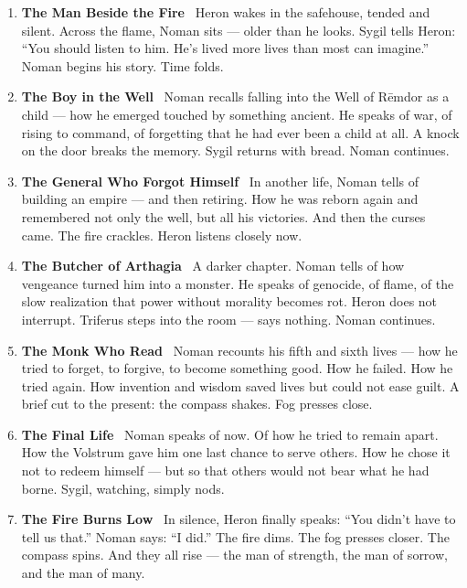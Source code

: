 \documentclass[9pt]{article}
\begin{document}
\begin{center}
\begin{enumerate}
\item \textbf{The Man Beside the Fire} \
Heron wakes in the safehouse, tended and silent. Across the flame, Noman sits — older than he looks. Sygil tells Heron: “You should listen to him. He’s lived more lives than most can imagine.” Noman begins his story. Time folds.

\vspace{.3in}
\item \textbf{The Boy in the Well} \
Noman recalls falling into the Well of Rēmdor as a child — how he emerged touched by something ancient. He speaks of war, of rising to command, of forgetting that he had ever been a child at all. A knock on the door breaks the memory. Sygil returns with bread. Noman continues.

\vspace{.3in}
\item \textbf{The General Who Forgot Himself} \
In another life, Noman tells of building an empire — and then retiring. How he was reborn again and remembered not only the well, but all his victories. And then the curses came. The fire crackles. Heron listens closely now.

\vspace{.3in}
\item \textbf{The Butcher of Arthagia} \
A darker chapter. Noman tells of how vengeance turned him into a monster. He speaks of genocide, of flame, of the slow realization that power without morality becomes rot. Heron does not interrupt. Triferus steps into the room — says nothing. Noman continues.

\vspace{.3in}
\item \textbf{The Monk Who Read} \
Noman recounts his fifth and sixth lives — how he tried to forget, to forgive, to become something good. How he failed. How he tried again. How invention and wisdom saved lives but could not ease guilt. A brief cut to the present: the compass shakes. Fog presses close.

\vspace{.3in}
\item \textbf{The Final Life} \
Noman speaks of now. Of how he tried to remain apart. How the Volstrum gave him one last chance to serve others. How he chose it not to redeem himself — but so that others would not bear what he had borne. Sygil, watching, simply nods.

\vspace{.3in}
\item \textbf{The Fire Burns Low} \
In silence, Heron finally speaks: “You didn’t have to tell us that.” Noman says: “I did.” The fire dims. The fog presses closer. The compass spins. And they all rise — the man of strength, the man of sorrow, and the man of many.

\end{enumerate}
\end{center}
\end{document}
